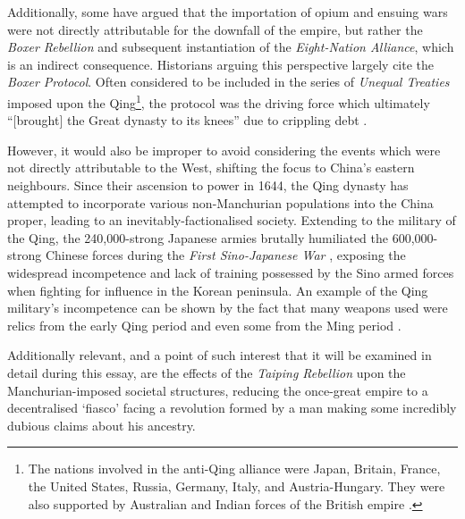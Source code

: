 \documentclass[a4paper,oneside]{article}
\begin{document}
        Additionally, some have argued that the importation of opium and ensuing wars were not directly attributable for the downfall of the empire, but rather the \textit{Boxer Rebellion} and subsequent instantiation of the \textit{Eight-Nation Alliance}, which is an indirect consequence. Historians arguing this perspective largely cite the \textit{Boxer Protocol}. Often considered to be included in the series of \textit{Unequal Treaties} imposed upon the Qing\footnote{The nations involved in the anti-Qing alliance were Japan, Britain, France, the United States, Russia, Germany, Italy, and Austria-Hungary. They were also supported by Australian and Indian forces of the British empire \autocite{Gardener:2016}.}, the protocol was the driving force which ultimately ``[brought] the Great dynasty to its knees'' due to crippling debt \autocite{Mitchell:2008}.

        However, it would also be improper to avoid considering the events which were not directly attributable to the West, shifting the focus to China's eastern neighbours. Since their ascension to power in 1644, the Qing dynasty has attempted to incorporate various non-Manchurian populations into the China proper, leading to an inevitably-factionalised society. Extending to the military of the Qing, the 240,000-strong Japanese armies brutally humiliated the 600,000-strong Chinese forces during the \textit{First Sino-Japanese War} \autocite{Fenby:2013}, exposing the widespread incompetence and lack of training possessed by the Sino armed forces \autocite{Jowett:2013} when fighting for influence in the Korean peninsula. An example of the Qing military's incompetence can be shown by the fact that many weapons used were relics from the early Qing period and even some from the Ming period \autocite{Qi:1964}.

        Additionally relevant, and a point of such interest that it will be examined in detail during this essay, are the effects of the \textit{Taiping Rebellion} upon the Manchurian-imposed societal structures, reducing the once-great empire to a decentralised `fiasco' facing a revolution formed by a man making some incredibly dubious claims about his ancestry.
\end{document}
